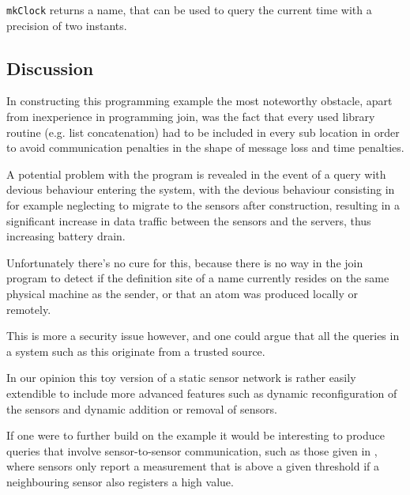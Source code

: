 \texttt{mkClock} returns a name, that can be used to query the current time
with a precision of two instants.


\subsection*{Discussion}

In constructing this programming example the most noteworthy obstacle, apart
from inexperience in programming join, was the fact that every used library
routine (e.g. list concatenation) had to be included in every sub location in
order to avoid communication penalties in the shape of message loss and time
penalties.

A potential problem with the program is revealed in the event of a query with
devious behaviour entering the system, with the devious behaviour consisting in
for example neglecting to migrate to the sensors after construction, resulting
in a significant increase in data traffic between the sensors and the servers,
thus increasing battery drain.

Unfortunately there's no cure for this, because there is no way in the join
program to detect if the definition site of a name currently resides on the same
physical machine as the sender, or that an atom was produced locally or
remotely.

This is more a security issue however, and one could argue that all the queries
in a system such as this originate from a trusted source.

In our opinion this toy version of a static sensor network is rather easily
extendible to include more advanced features such as dynamic reconfiguration of
the sensors and dynamic addition or removal of sensors.

If one were to further build on the example it would be interesting to produce
queries that involve sensor-to-sensor communication, such as those given in
\cite{bonnet2001towards}, where sensors only report a measurement that is above
a given threshold if a neighbouring sensor also registers a high value.
